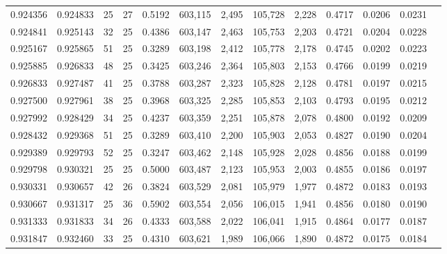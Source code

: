 \begin{tabular}{rrrrrrrrrrrrr}
0.924356 & 0.924833 &    25 &  27 &                                     0.5192 & 603,115 &   2,495 & 105,728 &   2,228 & 0.4717 & 0.0206 & 0.0231 \\
0.924841 & 0.925143 &    32 &  25 &                                     0.4386 & 603,147 &   2,463 & 105,753 &   2,203 & 0.4721 & 0.0204 & 0.0228 \\
0.925167 & 0.925865 &    51 &  25 &                                     0.3289 & 603,198 &   2,412 & 105,778 &   2,178 & 0.4745 & 0.0202 & 0.0223 \\
0.925885 & 0.926833 &    48 &  25 &                                     0.3425 & 603,246 &   2,364 & 105,803 &   2,153 & 0.4766 & 0.0199 & 0.0219 \\
0.926833 & 0.927487 &    41 &  25 &                                     0.3788 & 603,287 &   2,323 & 105,828 &   2,128 & 0.4781 & 0.0197 & 0.0215 \\
0.927500 & 0.927961 &    38 &  25 &                                     0.3968 & 603,325 &   2,285 & 105,853 &   2,103 & 0.4793 & 0.0195 & 0.0212 \\
0.927992 & 0.928429 &    34 &  25 &                                     0.4237 & 603,359 &   2,251 & 105,878 &   2,078 & 0.4800 & 0.0192 & 0.0209 \\
0.928432 & 0.929368 &    51 &  25 &                                     0.3289 & 603,410 &   2,200 & 105,903 &   2,053 & 0.4827 & 0.0190 & 0.0204 \\
0.929389 & 0.929793 &    52 &  25 &                                     0.3247 & 603,462 &   2,148 & 105,928 &   2,028 & 0.4856 & 0.0188 & 0.0199 \\
0.929798 & 0.930321 &    25 &  25 &                                     0.5000 & 603,487 &   2,123 & 105,953 &   2,003 & 0.4855 & 0.0186 & 0.0197 \\
0.930331 & 0.930657 &    42 &  26 &                                     0.3824 & 603,529 &   2,081 & 105,979 &   1,977 & 0.4872 & 0.0183 & 0.0193 \\
0.930667 & 0.931317 &    25 &  36 &                                     0.5902 & 603,554 &   2,056 & 106,015 &   1,941 & 0.4856 & 0.0180 & 0.0190 \\
0.931333 & 0.931833 &    34 &  26 &                                     0.4333 & 603,588 &   2,022 & 106,041 &   1,915 & 0.4864 & 0.0177 & 0.0187 \\
0.931847 & 0.932460 &    33 &  25 &                                     0.4310 & 603,621 &   1,989 & 106,066 &   1,890 & 0.4872 & 0.0175 & 0.0184 \\

\end{tabular}
